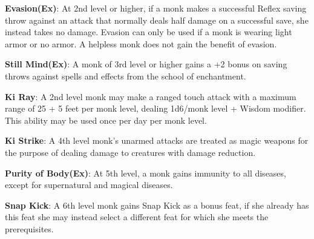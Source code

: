 \textbf{Evasion(Ex)}: At 2nd level or higher, if a monk makes a successful Reflex saving throw against an attack that normally deals half damage on a successful save, she instead takes no damage. Evasion can only be used if a monk is wearing light armor or no armor. A helpless monk does not gain the benefit of evasion.

\textbf{Still Mind(Ex)}: A monk of 3rd level or higher gains a +2 bonus on saving throws against spells and effects from the school of enchantment.

\textbf{Ki Ray}: A 2nd level monk may make a ranged touch attack with a maximum range of 25 + 5 feet per monk level, dealing 1d6/monk level + Wisdom modifier. This ability may be used once per day per monk level.

\textbf{Ki Strike}: A 4th level monk's unarmed attacks are treated as magic weapons for the purpose of dealing damage to creatures with damage reduction.

\textbf{Purity of Body(Ex)}: At 5th level, a monk gains immunity to all diseases, except for supernatural and magical diseases.

\textbf{Snap Kick}: A 6th level monk gains Snap Kick as a bonus feat, if she already has this feat she may instead select a different feat for which she meets the prerequisites.